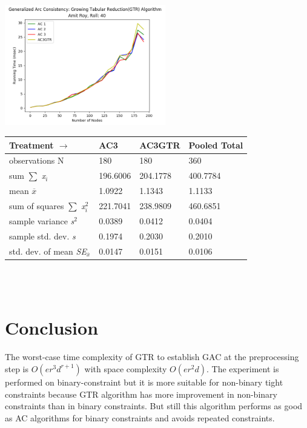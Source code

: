 \documentclass[11pt , conference]{IEEEtran}
\begin{document}
	\begin{minipage}{\textwidth}
		\begin{minipage}[b]{0.49\textwidth}
			\centering
	\includegraphics[width=7cm]{performance.png}
		\end{minipage}
		\hfill
		\begin{minipage}[b]{0.5\textwidth}
			\centering
			\begin{tabular}{|l|l|l|l|}
				\hline
				Treatment $\to$ & AC3& AC3GTR& Pooled Total \\ \hline
				observations N& 180& 180& 360\\ \hline
				sum $\sum$ \textit{x$ _{i} $}& 196.6006  & 204.1778& 400.7784\\ \hline
				mean $\overline{x}$  & 1.0922&1.1343&1.1133\\ \hline
				sum of squares $\sum$ \textit{x$ _{i} ^{2} $}&221.7041 & 238.9809	&460.6851\\ \hline
				sample variance \textit{s$^{2} $} & 0.0389&0.0412& 0.0404\\ \hline
				sample std. dev. \textit{s}&0.1974&0.2030&0.2010\\ \hline
				std. dev. of mean \textit{SE$ _{\overline{x}}$}& 
				0.0147	&0.0151&0.0106\\ \hline
			\end{tabular}
			\vspace*{1em}
			\captionsetup{singlelinecheck = false, format= hang,  font=footnotesize, labelsep=space}
		\end{minipage}
	\end{minipage}\\\\
\section{Conclusion}
The worst-case time complexity of GTR to
establish GAC at the preprocessing step is $ O(er^{3}d^{r+1}) $ with
space complexity $ O(er^{2}d) $.
The experiment is performed on binary-constraint but it is more suitable for non-binary tight constraints because GTR algorithm has more improvement in non-binary constraints than in binary constraints. But still this algorithm performs as good as AC algorithms for binary constraints and avoids repeated constraints.
\end{document}
